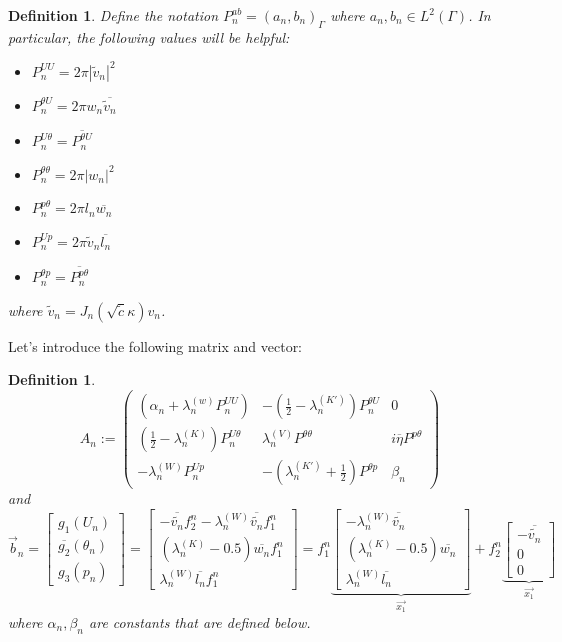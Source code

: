 \documentclass[10pt,journal,compsoc, onecolumn]{IEEEtran}
\newtheorem{definition}[theorem]{Definition}
\begin{document}
\begin{definition}
    Define the notation $P^{ab}_n = (a_n, b_n)_\Gamma$ where $a_n, b_n \in L^2(\Gamma)$. 
    In particular, the following values will be helpful: 
    \begin{itemize}
        \item $P^{UU}_n = 2\pi |\tilde v_n|^2$
        \item $P^{\theta U}_n = 2\pi w_n \overline{\tilde v_n}$
        \item $P^{U\theta}_n = \overline{P^{\theta U}_n}$
        \item $P^{\theta \theta}_n = 2 \pi |w_n|^2$
        \item $P^{p \theta}_n = 2\pi l_n\overline{w_n}$
        \item $P^{Up}_n = 2\pi \tilde v_n \overline{l_n}$
        \item $P^{\theta p}_n = \overline{P^{p\theta}_n }$
    \end{itemize}
    where $\tilde v_n = J_n(\sqrt{\tilde c}\kappa )v_n$.
\end{definition}
Let's introduce the following matrix and vector: 
\begin{definition}
    \label{def:galerkin_matrix}
    $$
    A_n:= 
    \begin{pmatrix}
        (\alpha_n + \lambda_n^{(w)} P^{UU}_n)  & - (\frac{1}{2} - \lambda_n^{(K')}) P_n^{\theta U} & 0\\
        (\frac{1}{2} - \lambda_n^{(K)})P^{U\theta}_n  & \lambda^{(V)}_n P^{\theta \theta}  &  i \overline{\eta}     P^{p \theta} \\
        -\lambda_n^{(W)} P^{Up}_n  &  - (\lambda^{(K')}_n + \frac{1}{2})  P^{\theta p} & \beta_n 
    \end{pmatrix}
    $$
    and 
    $$
    \vec{b}_n = 
    \begin{bmatrix}
       g_1(U_n)\\
        \overline{g_2}(\theta_n) \\
        g_3(p_n)
    \end{bmatrix}
    = 
    \begin{bmatrix}
        - \overline{\tilde{v_n}} f_2^n - \lambda_n^{(W)} \overline{\tilde{v_n}} f_1^n \\
        (\lambda_n^{(K)} - 0.5)  \overline{w_n} f_1^n\\
        \lambda_n^{(W)} \overline{l_n} f_1^n
    \end{bmatrix}
= f_1^n 
\underbrace{
\begin{bmatrix}
- \lambda_n^{(W)} \overline{\tilde{v_n}} \\
(\lambda_n^{(K)} - 0.5) \overline{w_n}  \\
\lambda_n^{(W)} \overline{l_n}
\end{bmatrix}}_{\vec{x_1}}
+ f_2^n
\underbrace{\begin{bmatrix}
    - \overline{\tilde{v_n}} \\
    0 \\
    0
\end{bmatrix}}_{\vec{x_1}}
    $$
    where $\alpha_n, \beta_n$ are constants that are defined below. 
\end{definition}
\end{document}
